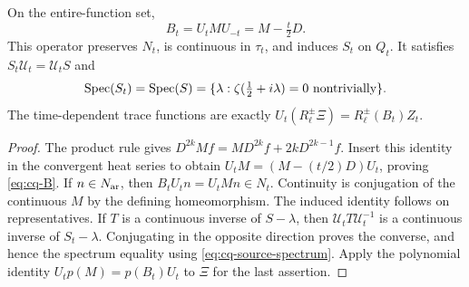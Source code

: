 \begin{cqtheorem}\label{thm:cq-moving}
On the entire-function set,
\begin{equation}\label{eq:cq-B}
 B_t=U_tMU_{-t}=M-\tfrac t2D.
\end{equation}
This operator preserves $N_t$, is continuous in $\tau_t$, and induces
$S_t$ on $Q_t$. It satisfies
$S_t\mathcal U_t=\mathcal U_tS$ and
\begin{equation}\label{eq:cq-specmove}
 \operatorname{Spec}(S_t)=\operatorname{Spec}(S)
 =\{\lambda:\zeta(\tfrac12+i\lambda)=0\text{ nontrivially}\}.
\end{equation}
The time-dependent trace functions are exactly
$U_t(R_\ell^\pm\Xi)=R_\ell^\pm(B_t)Z_t$.
\end{cqtheorem}
\begin{proof}
The product rule gives $D^{2k}Mf=MD^{2k}f+2kD^{2k-1}f$.
Insert this identity in the convergent heat series to obtain
$U_tM=(M-(t/2)D)U_t$, proving \eqref{eq:cq-B}.
If $n\in N_{\rm ar}$, then $B_tU_tn=U_tMn\in N_t$.
Continuity is conjugation of the continuous $M$ by the defining
homeomorphism. The induced identity follows on representatives.
If $T$ is a continuous inverse of $S-\lambda$, then
$\mathcal U_tT\mathcal U_t^{-1}$ is a continuous inverse of
$S_t-\lambda$. Conjugating in the opposite direction proves the
converse, and hence the spectrum equality using
\eqref{eq:cq-source-spectrum}. Apply the polynomial identity
$U_tp(M)=p(B_t)U_t$ to $\Xi$ for the last assertion.
\end{proof}

